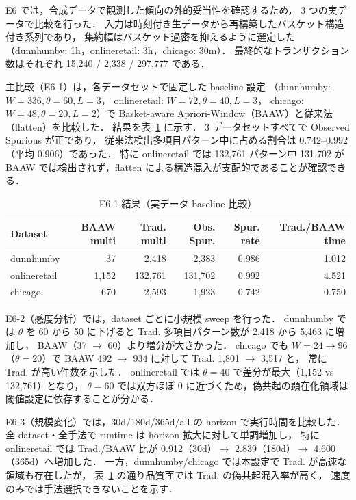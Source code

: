 E6 では，合成データで観測した傾向の外的妥当性を確認するため，
3 つの実データで比較を行った．
入力は時刻付き生データから再構築したバスケット構造付き系列であり，
集約幅はバスケット過密を抑えるように選定した
（dunnhumby: 1h，onlineretail: 3h，chicago: 30m）．
最終的なトランザクション数はそれぞれ 15,240 / 2,338 / 297,777 である．

主比較（E6-1）は，各データセットで固定した baseline 設定
（dunnhumby: $W=336,\theta=60,L=3$，
onlineretail: $W=72,\theta=40,L=3$，
chicago: $W=48,\theta=20,L=2$）で
Basket-aware Apriori-Window（BAAW）と従来法（flatten）を比較した．
結果を表~\ref{tab:e6_real_main} に示す．
3 データセットすべてで Observed Spurious が正であり，
従来法検出多項目パターン中に占める割合は
0.742--0.992（平均 0.906）であった．
特に onlineretail では 132,761 パターン中 131,702 が
BAAW では検出されず，flatten による構造混入が支配的であることが確認できる．

\begin{table}[t]
\caption{E6-1 結果（実データ baseline 比較）}
\label{tab:e6_real_main}
\centering
\scriptsize
\begin{tabular}{lrrrrr}
\toprule
Dataset & BAAW multi & Trad. multi & Obs. Spur. & Spur. rate & Trad./BAAW time \\
\midrule
dunnhumby    & 37   & 2,418   & 2,383   & 0.986 & 1.012 \\
onlineretail & 1,152 & 132,761 & 131,702 & 0.992 & 4.521 \\
chicago      & 670  & 2,593   & 1,923   & 0.742 & 0.750 \\
\bottomrule
\end{tabular}
\end{table}

E6-2（感度分析）では，dataset ごとに小規模 sweep を行った．
dunnhumby では $\theta$ を 60 から 50 に下げると
Trad. 多項目パターン数が 2,418 から 5,463 に増加し，
BAAW（37 $\rightarrow$ 60）より増分が大きかった．
chicago でも $W=24 \rightarrow 96$（$\theta=20$）で
BAAW 492 $\rightarrow$ 934 に対して Trad. 1,801 $\rightarrow$ 3,517 と，
常に Trad. が高い件数を示した．
onlineretail では $\theta=40$ で差分が最大（1,152 vs 132,761）となり，
$\theta=60$ では双方ほぼ 0 に近づくため，偽共起の顕在化領域は
閾値設定に依存することが分かる．

E6-3（規模変化）では，30d/180d/365d/all の horizon で実行時間を比較した．
全 dataset・全手法で runtime は horizon 拡大に対して単調増加し，
特に onlineretail では Trad./BAAW 比が
0.912（30d）$\rightarrow$ 2.839（180d）$\rightarrow$ 4.600（365d）へ増加した．
一方，dunnhumby/chicago では本設定で Trad. が高速な領域も存在したが，
表~\ref{tab:e6_real_main} の通り品質面では Trad. の偽共起混入率が高く，
速度のみでは手法選択できないことを示す．

